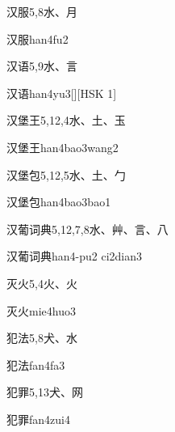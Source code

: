 \begin{entry}{汉服}{5,8}{⽔、⽉}
  \begin{phonetics}{汉服}{han4fu2}
  \end{phonetics}
\end{entry}

\begin{entry}{汉语}{5,9}{⽔、⾔}
  \begin{phonetics}{汉语}{han4yu3}[][HSK 1]
  \end{phonetics}
\end{entry}

\begin{entry}{汉堡王}{5,12,4}{⽔、⼟、⽟}
  \begin{phonetics}{汉堡王}{han4bao3wang2}
  \end{phonetics}
\end{entry}

\begin{entry}{汉堡包}{5,12,5}{⽔、⼟、⼓}
  \begin{phonetics}{汉堡包}{han4bao3bao1}
  \end{phonetics}
\end{entry}

\begin{entry}{汉葡词典}{5,12,7,8}{⽔、⾋、⾔、⼋}
  \begin{phonetics}{汉葡词典}{han4-pu2 ci2dian3}
  \end{phonetics}
\end{entry}

\begin{entry}{灭火}{5,4}{⽕、⽕}
  \begin{phonetics}{灭火}{mie4huo3}
  \end{phonetics}
\end{entry}

\begin{entry}{犯法}{5,8}{⽝、⽔}
  \begin{phonetics}{犯法}{fan4fa3}
  \end{phonetics}
\end{entry}

\begin{entry}{犯罪}{5,13}{⽝、⽹}
  \begin{phonetics}{犯罪}{fan4zui4}
  \end{phonetics}
\end{entry}

